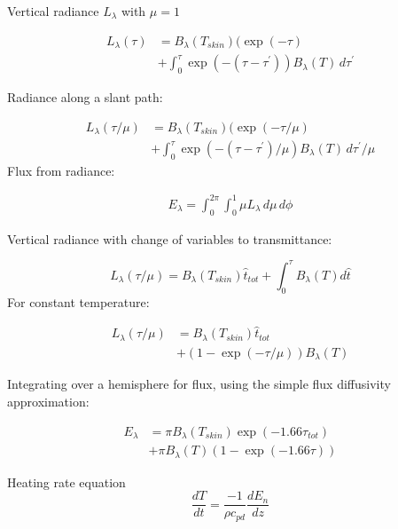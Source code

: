 \documentclass[12pt]{article}
\begin{document}
\begin{multicols}{2}
\noindent
Vertical radiance $L_\lambda$  with $\mu = 1$

\begin{align}
  L_\lambda(\tau)&= B_\lambda(T_{skin})( \exp(-\tau)  \nonumber \\
  &+    \int_0^{\tau} \exp\left(  - (\tau -\tau^\prime) \right )
     B_\lambda(T)\, d\tau^\prime 
\end{align}


\noindent
Radiance along a slant path:

\begin{align}
  L_\lambda(\tau/\mu) &= B_\lambda(T_{skin})( \exp(-\tau/\mu) \nonumber \\
  &+  \int_0^{\tau} \exp\left(  - (\tau -\tau^\prime)/\mu \right )
     B_\lambda(T)\, d\tau^\prime/\mu 
   \end{align}
\noindent
Flux from radiance:

   \begin{align}
     \label{eq:flux}
     E_\lambda = \int_0^{2\pi} \int_0^1 \mu L_\lambda \, d\mu\, d\phi 
   \end{align}

   

\noindent
Vertical radiance with change of variables to transmittance:   

\begin{equation}
       L_\lambda(\tau/\mu)= B_\lambda(T_{skin}) \hat{t}_{tot} +    \int_0^{\tau} B_\lambda(T) d\hat{t} 
     \end{equation}
\noindent
For constant temperature:

\begin{align}
  L_\lambda(\tau/\mu)&= B_\lambda(T_{skin}) \hat{t}_{tot} \nonumber\\
             &+  (1 - \exp(-\tau/\mu) )B_\lambda(T)
\end{align}


\noindent
Integrating over a hemisphere for flux, using the simple flux diffusivity approximation:

\begin{align}
  E_\lambda &= \pi B_\lambda(T_{skin}) \exp(-1.66 \tau_{tot}) \nonumber \\
  & +   \pi B_\lambda(T)(1 - \exp(-1.66 \tau))
\end{align}


\noindent
Heating rate equation
\begin{equation}
  \label{eq:fluxdiv}
  \frac{dT}{dt} = \frac{-1}{\rho c_{pd}} \frac{dE_n}{dz}
\end{equation}


\end{multicols}
\end{document}
